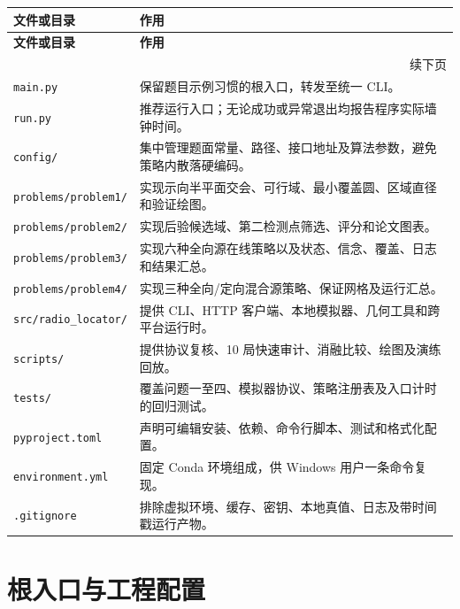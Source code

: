 \begin{longtable}{p{}p{}}
\toprule
\textbf{文件或目录} & \textbf{作用} \\
\midrule
\endfirsthead
\toprule
\textbf{文件或目录} & \textbf{作用} \\
\midrule
\endhead
\midrule
\multicolumn{2}{r}{续下页} \\
\endfoot
\bottomrule
\endlastfoot
\texttt{main.py} & 保留题目示例习惯的根入口，转发至统一 CLI。 \\
\texttt{run.py} & 推荐运行入口；无论成功或异常退出均报告程序实际墙钟时间。 \\
\texttt{config/} & 集中管理题面常量、路径、接口地址及算法参数，避免策略内散落硬编码。 \\
\texttt{problems/problem1/} & 实现示向半平面交会、可行域、最小覆盖圆、区域直径和验证绘图。 \\
\texttt{problems/problem2/} & 实现后验候选域、第二检测点筛选、评分和论文图表。 \\
\texttt{problems/problem3/} & 实现六种全向源在线策略以及状态、信念、覆盖、日志和结果汇总。 \\
\texttt{problems/problem4/} & 实现三种全向/定向混合源策略、保证网格及运行汇总。 \\
\texttt{src/radio_locator/} & 提供 CLI、HTTP 客户端、本地模拟器、几何工具和跨平台运行时。 \\
\texttt{scripts/} & 提供协议复核、10 局快速审计、消融比较、绘图及演练回放。 \\
\texttt{tests/} & 覆盖问题一至四、模拟器协议、策略注册表及入口计时的回归测试。 \\
\texttt{pyproject.toml} & 声明可编辑安装、依赖、命令行脚本、测试和格式化配置。 \\
\texttt{environment.yml} & 固定 Conda 环境组成，供 Windows 用户一条命令复现。 \\
\texttt{.gitignore} & 排除虚拟环境、缓存、密钥、本地真值、日志及带时间戳运行产物。 \\
\end{longtable}

\clearpage
\section{根入口与工程配置}



